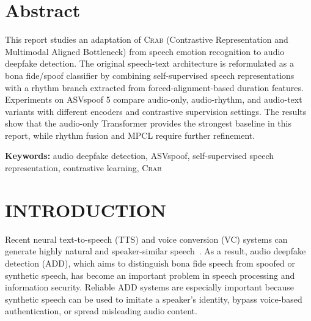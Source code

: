 \documentclass[12pt, a4paper, twocolumn]{article}
\newcommand{\crab}{\textsc{Crab}}
\begin{document}

\section*{Abstract}

This report studies an adaptation of \crab{} (Contrastive Representation and
Multimodal Aligned Bottleneck) from speech emotion recognition to audio deepfake
detection. The original speech-text architecture is reformulated as a
bona fide/spoof classifier by combining self-supervised speech representations
with a rhythm branch extracted from forced-alignment-based duration features.
Experiments on ASVspoof 5 compare audio-only, audio-rhythm, and audio-text
variants with different encoders and contrastive supervision settings. The
results show that the audio-only Transformer provides the strongest baseline in
this report, while rhythm fusion and MPCL require further refinement.

\noindent\textbf{Keywords:} audio deepfake detection, ASVspoof, self-supervised speech representation, contrastive learning, \crab

\vspace{1em}

\section{INTRODUCTION}

Recent neural text-to-speech (TTS) and voice conversion (VC) systems can generate highly natural and speaker-similar speech~\cite{yi2023audio}.
As a result, audio deepfake detection (ADD), which aims to distinguish bona fide speech from spoofed or synthetic speech, has become an important problem in speech processing and information security.
Reliable ADD systems are especially important because synthetic speech can be used to imitate a speaker's identity, bypass voice-based authentication, or spread misleading audio content.
\end{document}
